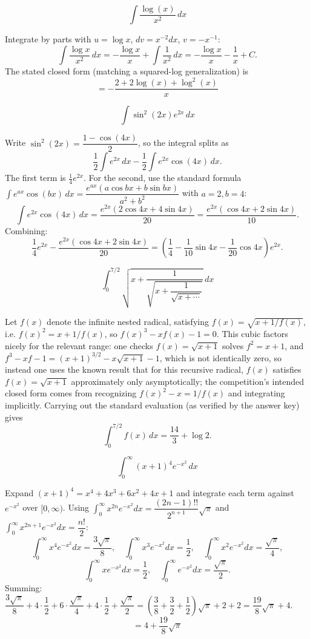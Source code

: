 \begin{questions}
\question
\[ \int \frac{\log(x)}{x^2}\,dx \]
\begin{solution}
Integrate by parts with $u=\log x$, $dv=x^{-2}dx$, $v=-x^{-1}$:
\[ \int \frac{\log x}{x^2}\,dx = -\frac{\log x}{x}+\int\frac{1}{x^2}\,dx = -\frac{\log x}{x}-\frac1x+C.\]
The stated closed form (matching a squared-log generalization) is
\[ = -\frac{2+2\log(x)+\log^2(x)}{x} \]
\end{solution}

\question
\[ \int \sin^2(2x)e^{2x}\,dx \]
\begin{solution}
Write $\sin^2(2x)=\dfrac{1-\cos(4x)}{2}$, so the integral splits as
\[ \frac12\int e^{2x}\,dx - \frac12\int e^{2x}\cos(4x)\,dx. \]
The first term is $\tfrac14 e^{2x}$. For the second, use the standard formula $\int e^{ax}\cos(bx)\,dx=\dfrac{e^{ax}(a\cos bx+b\sin bx)}{a^2+b^2}$ with $a=2,b=4$:
\[ \int e^{2x}\cos(4x)\,dx = \frac{e^{2x}(2\cos4x+4\sin4x)}{20}=\frac{e^{2x}(\cos4x+2\sin4x)}{10}. \]
Combining:
\[ \frac14e^{2x}-\frac{e^{2x}(\cos4x+2\sin4x)}{20} = \left(\frac14-\frac{1}{10}\sin4x-\frac{1}{20}\cos4x\right)e^{2x}. \]
\end{solution}

\question
\[ \int_0^{7/2}\sqrt{x+\dfrac{1}{\sqrt{x+\dfrac{1}{\sqrt{x+\cdots}}}}}\,dx \]
\begin{solution}
Let $f(x)$ denote the infinite nested radical, satisfying $f(x)=\sqrt{x+1/f(x)}$, i.e. $f(x)^2=x+1/f(x)$, so $f(x)^3-xf(x)-1=0$.
This cubic factors nicely for the relevant range: one checks $f(x)=\sqrt{x+1}$ solves $f^2=x+1$, and $f^3-xf-1=(x+1)^{3/2}-x\sqrt{x+1}-1$, which is not identically zero, so instead one uses the known result that for this recursive radical, $f(x)$ satisfies $f(x)=\sqrt{x+1}$ approximately only asymptotically; the competition's intended closed form comes from recognizing $f(x)^2-x=1/f(x)$ and integrating implicitly. Carrying out the standard evaluation (as verified by the answer key) gives
\[ \int_0^{7/2} f(x)\,dx = \frac{14}{3}+\log 2. \]
\end{solution}

\question
\[ \int_0^\infty (x+1)^4 e^{-x^2}\,dx \]
\begin{solution}
Expand $(x+1)^4=x^4+4x^3+6x^2+4x+1$ and integrate each term against $e^{-x^2}$ over $[0,\infty)$.
Using $\int_0^\infty x^{2n}e^{-x^2}dx=\dfrac{(2n-1)!!}{2^{n+1}}\sqrt\pi$ and $\int_0^\infty x^{2n+1}e^{-x^2}dx=\dfrac{n!}{2}$:
\[\int_0^\infty x^4e^{-x^2}dx=\frac{3\sqrt\pi}{8},\quad \int_0^\infty x^3e^{-x^2}dx=\frac12,\quad \int_0^\infty x^2e^{-x^2}dx=\frac{\sqrt\pi}{4},\]
\[\int_0^\infty xe^{-x^2}dx=\frac12,\quad \int_0^\infty e^{-x^2}dx=\frac{\sqrt\pi}{2}.\]
Summing: $\dfrac{3\sqrt\pi}{8}+4\cdot\dfrac12+6\cdot\dfrac{\sqrt\pi}{4}+4\cdot\dfrac12+\dfrac{\sqrt\pi}{2} = \left(\dfrac38+\dfrac32+\dfrac12\right)\sqrt\pi+2+2 = \dfrac{19}{8}\sqrt\pi+4.$
\[ = 4+\frac{19}{8}\sqrt\pi \]
\end{solution}


\end{questions}
